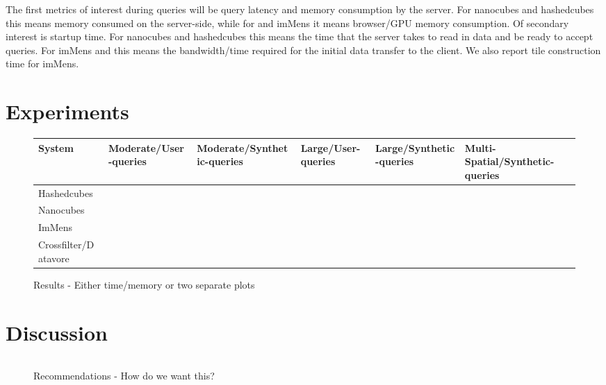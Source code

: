 \documentclass[journal]{vgtc}                %
\begin{document}

The first metrics of interest during queries will be query latency and memory consumption by the server. For nanocubes and hashedcubes this means memory consumed on the server-side, while for  and imMens it means browser/GPU memory consumption. Of secondary interest is startup time. For nanocubes and hashedcubes this means the time that the server takes to read in data and be ready to accept queries. For imMens and  this means the bandwidth/time required for the initial data transfer to the client. We also report tile construction time for imMens. 

\section{Experiments}

\begin{figure*}
 \scriptsize
 \label{results-figure}
 \caption{Results - Either time/memory or two separate plots}
 \begin{tabular}{ p{2.5cm}p{2.5cm}p{2.5cm}p{2.5cm}p{2.5cm}p{2.5cm} }
	 System & 
	 Moderate/User-queries & 
	 Moderate/Synthetic-queries & 
	 Large/User-queries & 
	 Large/Synthetic-queries & 
	 Multi-Spatial/Synthetic-queries \\
   \hline
   Hashedcubes &&&&& \\
   Nanocubes &&&&& \\
   ImMens &&&&& \\
   Crossfilter/Datavore &&&&& \\
 \end{tabular}
\end{figure*}



\section{Discussion}

\begin{figure*}
 \scriptsize
 \label{recommendations-figure}
 \caption{Recommendations - How do we want this?}
 \begin{tabular}{ p{2.5cm}p{2.5cm}p{2.5cm}p{2.5cm}p{2.5cm}p{2.5cm} }
 \end{tabular}
\end{figure*}
\end{document}
